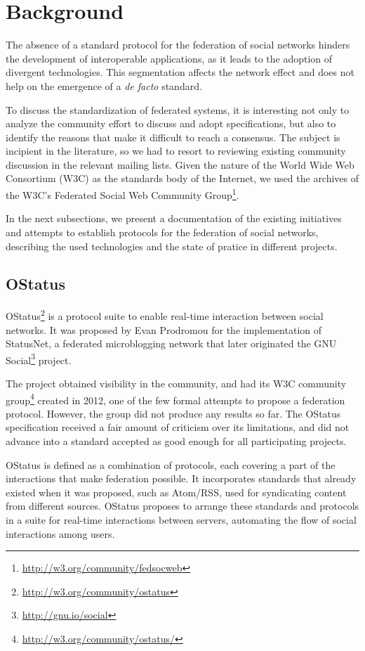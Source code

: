 \chapter{Background}
\label{chapter:2}

The absence of a standard protocol for the federation of social networks
hinders the development of interoperable applications, as it leads to
the adoption of divergent technologies. This segmentation affects the
network effect and does not help on the emergence of a \textit{de facto}
standard.

To discuss the standardization of federated systems, it is interesting not only
to analyze the community effort to discuss and adopt specifications, but also
to identify the reasons that make it difficult to reach a consensus. The
subject is incipient in the literature, so we had to resort to reviewing
existing community discussion in the relevant mailing lists. Given the nature
of the World Wide Web Consortium (W3C) as the standards body of the Internet,
we used the archives of the W3C's Federated Social Web Community
Group\footnote{\url{http://w3.org/community/fedsocweb}}.

In the next subsections, we present a documentation of the existing initiatives
and attempts to establish protocols for the federation of social networks,
describing the used technologies and the state of pratice in different
projects.


\section{OStatus}

OStatus\footnote{\url{http://w3.org/community/ostatus}} is a protocol suite to
enable real-time interaction between social networks.  It was proposed by Evan
Prodromou for the implementation of StatusNet, a federated microblogging
network that later originated the GNU
Social\footnote{\url{http://gnu.io/social}} project.

The project obtained visibility in the community, and had its W3C community
group\footnote{\url{http://w3.org/community/ostatus/}} created in 2012, one of
the few formal attempts to propose a federation protocol. However, the group
did not produce any results so far. The OStatus specification received a fair
amount of criticism over its limitations, and did not advance into a standard
accepted as good enough for all participating projects.

OStatus is defined as a combination of protocols, each covering a part
of the interactions that make federation possible. It incorporates
standards that already existed when it was proposed, such as Atom/RSS,
used for syndicating content from different sources.  OStatus proposes
to arrange these standards and protocols in a suite for real-time
interactions between servers, automating the flow of social interactions
among users.

